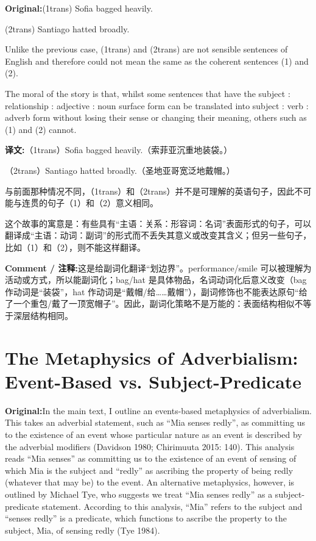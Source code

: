 \documentclass[11pt,a4paper]{article}
\newcommand{\eng}[1]{\begin{engbox}\noindent\textbf{Original:}\quad #1\end{engbox}}
\newcommand{\cn}[1]{\begin{cnbox}\noindent\textbf{译文:}\quad #1\end{cnbox}}
\newcommand{\cmt}[1]{\begin{commentbox}\noindent\textbf{Comment / 注释:}\quad #1\end{commentbox}}
\begin{document}
\eng{(1trans) Sofia bagged heavily.

(2trans) Santiago hatted broadly.

Unlike the previous case, (1trans) and (2trans) are not sensible sentences of English and therefore could not mean the same as the coherent sentences (1) and (2).

The moral of the story is that, whilst some sentences that have the subject : relationship : adjective : noun surface form can be translated into subject : verb : adverb form without losing their sense or changing their meaning, others such as (1) and (2) cannot.}

\cn{（1trans）Sofia bagged heavily.（索菲亚沉重地装袋。）

（2trans）Santiago hatted broadly.（圣地亚哥宽泛地戴帽。）

与前面那种情况不同，（1trans）和（2trans）并不是可理解的英语句子，因此不可能与连贯的句子（1）和（2）意义相同。

这个故事的寓意是：有些具有“主语：关系：形容词：名词”表面形式的句子，可以翻译成“主语：动词：副词”的形式而不丢失其意义或改变其含义；但另一些句子，比如（1）和（2），则不能这样翻译。}

\cmt{这是给副词化翻译“划边界”。performance/smile 可以被理解为活动或方式，所以能副词化；bag/hat 是具体物品，名词动词化后意义改变（bag 作动词是“装袋”，hat 作动词是“戴帽/给……戴帽”），副词修饰也不能表达原句“给了一个重包/戴了一顶宽帽子”。因此，副词化策略不是万能的：表面结构相似不等于深层结构相同。}

\section{The Metaphysics of Adverbialism: Event-Based vs. Subject-Predicate}

\eng{In the main text, I outline an events-based metaphysics of adverbialism. This takes an adverbial statement, such as “Mia senses redly”, as committing us to the existence of an event whose particular nature as an event is described by the adverbial modifiers (Davidson 1980; Chirimuuta 2015: 140). This analysis reads “Mia senses” as committing us to the existence of an event of sensing of which Mia is the subject and “redly” as ascribing the property of being redly (whatever that may be) to the event. An alternative metaphysics, however, is outlined by Michael Tye, who suggests we treat “Mia senses redly” as a subject-predicate statement. According to this analysis, “Mia” refers to the subject and “senses redly” is a predicate, which functions to ascribe the property to the subject, Mia, of sensing redly (Tye 1984).}
\end{document}
